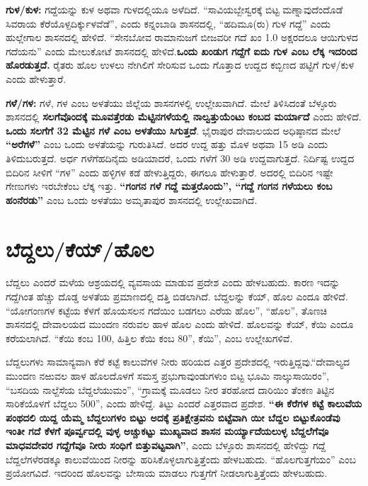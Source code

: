 \textbf{ಗುಳ/ಕುಳ:} ಗದ್ದೆಯನ್ನು ಕುಳ ಅಥವಾ ಗುಳದಲ್ಲಿಯೂ ಅಳೆದಿದೆ. “ಸಾವಿಯಬ್ಬೇಸ್ವರಕ್ಕೆ ಬಿಟ್ಟ ಮಣ್ನಾವುದೆಂದೊಡೆ ಸಿವರಾಯ ಕೆರೆಯೊಳ್ಪದಿರ್ಕ್ಕುಳವೆಡೆ”, ಎಂದು ಕನ್ನಂಬಾಡಿ ಶಾಸನದಲ್ಲಿ, “ಹದಿಮೂ(ರು) ಗುಳ ಗದ್ದೆ” ಎಂದು ಹುಲ್ಲೇಗಾಲ ಶಾಸನದಲ್ಲಿ ಹೇಳಿದೆ. “ಸೇನಬೋವ ರಾಮಾನುಜಗೆ ಬೀಜವರೀ ಗದೆ ಖಂ 1.0 ಅಕ್ಷರದಲೂ ಆಯಿಗುಳದ ಗದೆಯನು” ಎಂದು ಮೇಲುಕೋಟೆ ಶಾಸನದಲ್ಲಿ ಹೇಳಿದೆ.\textbf{ಒಂದು ಖಂಡುಗ ಗದ್ದೆಗೆ ಐದು ಗುಳ ಎಂಬ ಲೆಕ್ಕ ಇದರಿಂದ ಹೊರಡುತ್ತದೆ.} ರೈತರು ಹೊಲ ಉಳಲು ನೇಗಿಲಿಗೆ ಸೇರಿಸುವ ಒಂದು ಗೊತ್ತಾದ ಉದ್ದದ ಕಬ್ಬಿಣದ ಪಟ್ಟಿಗೆ ಗುಳ/ಕುಳ ಎಂದು ಹೇಳುತ್ತಾರೆ.

\textbf{ಗಳೆ/ಗಳ:} ಗಳೆ, ಗಳ ಎಂಬ ಅಳತೆಯು ಜಿಲ್ಲೆಯ ಶಾಸನಗಳಲ್ಲಿ ಉಲ್ಲೇಖವಾಗಿದೆ. ಮೇಲೆ ತಿಳಿಸಿದಂತೆ ಬೆಳ್ಳೂರು ಶಾಸನದಲ್ಲಿ \textbf{ಸಲಗೆವೊಂದಕ್ಕೆ ಮೂವತ್ತೆರಡು ಮೆಟ್ಟಿನಗಳೆಯಲ್ಲಿ ನಾಲ್ವತ್ತುಯೆಂಟು ಕಂಬದ ಮರ್ಯಾದೆ} ಎಂದು ಹೇಳಿದೆ. \textbf{ಒಂದು ಸಲಗೆಗೆ 32 ಮೆಟ್ಟಿನ ಗಳೆ ಎಂಬ ಅಳತೆಯು ಸಿಗುತ್ತದೆ}. ಭೈರಾಪುರ ದೇವಾಲಯದ ಅಧಿಷ್ಠಾನದ ಮೇಲೆ \textbf{“ಅರೆಗಳೆ”} ಎಂಬ ಒಂದು ಅಳತೆಯನ್ನು ಗುರುತಿಸಿದೆ. ಅದರ ಉದ್ದ ಹತ್ತು ಮೊಳ ಅಥವಾ 15 ಅಡಿ ಎಂದು ತಿಳಿದುಬರುತ್ತದೆ. ಅರ್ಧ ಗಳೆಗೆ\break ಹದಿನೈದು ಅಡಿಯಾದರೆ, ಒಂದು ಗಳೆಗೆ 30 ಅಡಿ ಉದ್ದವಾಗುತ್ತದೆ. ನಿರ್ದಿಷ್ಟ ಉದ್ದದ ಬಿದಿರಿನ ಸೀಳಿಗೆ “ಗಳ” ಎಂದು ಹಳ್ಳಿಗಳ ಕಡೆ ಹೇಳುತ್ತಿದ್ದರು, ಈಗಲೂ ಹೇಳುತ್ತಾರೆ. ಅದರಲ್ಲಿ ಬಿದಿರಿನ ಇಷ್ಟೇ ಗೇಣುಗಳು ಇರಬೇಕೆಂಬ ಲೆಕ್ಕ ಇತ್ತು. \textbf{“ಗಂಗನ ಗಳೆ ಗದ್ದೆ ಮತ್ತರೊಂದು”, “ಗದ್ದೆ ಗಂಗನ ಗಳೆಯಲು ಕಂಬ ಹಂನೆರಡು”} ಎಂಬ ಒಂದು ಅಳತೆಯು ಅಮೃತಾಪುರ ಶಾಸನದಲ್ಲಿ ಉಲ್ಲೇಖವಾಗಿದೆ.


\section{ಬೆದ್ದಲು/ಕೆಯ್​/ಹೊಲ}

ಬೆದ್ದಲು ಎಂದರೆ ಮಳೆಯ ಆಶ್ರಯದಲ್ಲಿ ವ್ಯವಸಾಯ ಮಾಡುವ ಪ್ರದೇಶ ಎಂದು ಹೇಳಬಹುದು. ಕಾರಣ ಇದನ್ನು ಗದ್ದೆಗಿಂತ ಹೆಚ್ಚು ದೊಡ್ಡ ಅಳತೆಯ ಪ್ರಮಾಣದಲ್ಲಿ ದತ್ತಿ ಬಿಡಲಾಗಿದೆ. ಬೆದ್ದಲನ್ನು ಕೆಯ್​, ಹೊಲ ಎಂದೂ ಹೇಳಿದೆ. “ಯೋಗಂಣಗಳ ಕಟ್ಟೆಯ ಕೆಳಗೆ ಹೊಯಸಲನ ಗದೆಯಿಂ ಬಡಗಲು ಎರೆಯ ಹೊಲ”, “ಹೊಲ”, ತೊಣಚಿ ಶಾಸನದಲ್ಲಿ ದೇವಾಲಯದ ಮುಂದಣ ನರುವಲ ಹಾಳ ಹೊಲ ಎಂದು ಹೇಳಿದೆ. ಹೊಲವನ್ನು ಕೆಯ್​, ಕೆಯಿ ಎಂದೂ ಕರೆಯಲಾಗಿದೆ. “ಕೆಯಿ ಕಂಬ 100, ಹಿತ್ತಿಲ ಕೆಯಿ ಕಂಬ 80”, ಕೆಯಿ”, ಎಂಬ ಉಲ್ಲೇಖಗಳಿವೆ.

ಬೆದ್ದಲುಗಳು ಸಾಮಾನ್ಯವಾಗಿ ಕೆರೆ ಕಟ್ಟೆ ಕಾಲುವೆಗಳ ನೀರು ಹರಿಯದ ಎತ್ತರ ಪ್ರದೇಶದಲ್ಲಿ ಇರುತ್ತಿದ್ದವು.\break “ದೇವಾಲ್ಯದ ಮುಂದಣ ನಱುವಲ ಹಾಳ ಹೊಲದೊಳಗೆ ಸಮಸ್ತ ಪ್ರಭುಗಾವುಂಡುಗಳುಂ ಬಿಟ್ಟ ಭೂಮಿ ನಾಲ್ಕುಸಾಯಿರಂ”, “ಬಸದಿಯ ನಾಲ್ದೆಸೆಯ ಬೆದ್ದಲೆಯುಮಂ”, “ಗ್ರಾಮಕ್ಕೆ ಮೂಡಲು ನೀರ ತರಹೋದ ದಾರಿಯಿಂ ತೆಂಕಣ ತಿಟ್ಟಿನ ಸಾರಿಕೆಯೊಳಗೆ ಬೆದ್ದಲು 500”, ಎಂದು ಹೇಳಿದ್ದೆ. ತಿಟ್ಟು ಎಂದರೆ ಎತ್ತರವಾದ ಪ್ರದೇಶ. \textbf{“ಈ ಕೆರೆಗಳ ಕಟ್ಟೆ ಕಾಲುವೆಯ ಪಂಥದಲಿ ಯಿದ್ದ ಯೆಮ್ಮ ಬೆದ್ದಲುಗಳಂ ಬಿಟ್ಟು ಅದಕ್ಕೆ ಪ್ರತಿಕ್ಷೇತ್ರವನು ಬಿಟ್ಟೆವಾಗಿ ಯೀ ಬೆದ್ದಲ ಬಿಟ್ಟುಕೊಂಡೆವು ಇಂತೀ ಗದೆ ಕೆಳಗೆ ಪೂರ್ವ್ವದಲ್ಲಿ ವುಳ್ಳ ಅಚ್ಚುಕಟ್ಟು ಮುಖ್ಯವಾದ ಶಾಸನ ಮರ್ಯ್ಯಾದೆಯಲುಳ್ಳ ಬೆದ್ದಲೆಗೆವೂ ಮಾಧವದೇವರ ಗದ್ದೆಗೆವೂ ನೀರು ಸಂಧಿಗೆ ಬಿತ್ತುವಟ್ಟವಾಗಿ”}, ಎಂದು ಬೆಳ್ಳೂರು ಶಾಸನದಲ್ಲಿ ಹೇಳಿದ್ದು ಗದ್ದೆ ಬೆದ್ದಲೆಗಳೆರಡಕ್ಕೂ ಕಾಲುವೆಯಿಂದ ನೀರನ್ನು ಹರಿಸಿಕೊಳ್ಳಲಾಗುತ್ತಿತ್ತೆಂದು ಹೇಳಬಹುದು. “ಹೊಲಗುತ್ತಗೆಯಂ” ಎಂಬ ಪ್ರಯೋಗವಿದೆ. ಇದರಿಂದ ಹೊಲವನ್ನು ಬೇಸಾಯ ಮಾಡಲು ಗುತ್ತಗೆಗೆ ನೀಡಲಾಗುತ್ತಿತ್ತೆಂದು ಹೇಳಬಹುದು.


